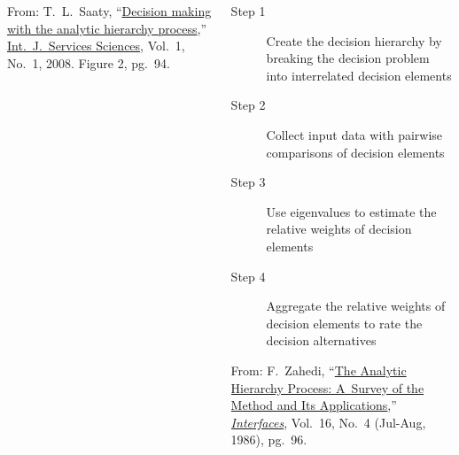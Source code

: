 \documentclass[10pt,handout,hyperref={colorlinks=true,linkcolor=blue,citecolor=citelink,urlcolor=gray}]{beamer}
\newcounter{e_temp}
\begin{document}
\begin{frame}[label=FlowChart]
{\begin{columns}[c]
\begin{column}{0.45\textwidth}
	\parbox{\textwidth}{From: T.~L.~Saaty, ``\href{http://mathsci2.appstate.edu/~wmcb/Class/5340/ClassNotes141/AHP/Analytic\%20Hierarchy\%20Proc\%20Saaty\%202008.pdf}{Decision making with the analytic hierarchy process},'' \href{http://www.inderscience.com/info/inarticletoc.php?jcode=ijssci&year=2013&vol=5&issue=1}{Int.~J.~Services Sciences}, Vol.~1, No.~1, 2008. Figure 2, pg.~94.}
	\vfill
      \end{column}
      \pause
      \begin{column}{0.55\textwidth}
      	\hspace*{-10ex}\parbox{1.125\textwidth}{%
	\begin{description}
	\item[Step 1]  Create the decision hierarchy by breaking the decision problem into interrelated decision elements
	\item[Step 2]  Collect input data with pairwise comparisons of decision elements
	\item[Step 3]  Use eigenvalues to estimate the relative weights of decision elements
	\item[Step 4]  Aggregate the relative weights of decision elements to rate the decision alternatives \\[9.5ex]
	\end{description}}
	\vfill
	From: F.~Zahedi, ``\href{http://www.jstor.org/stable/25060854}{The Analytic Hierarchy Process: A~Survey of the Method and Its Applications},'' 
	\href{http://pubsonline.informs.org/toc/inte/current}{\emph{Interfaces}}, Vol.~16, No.~4 (Jul-Aug, 1986), pg.~96.
      \end{column}
\end{columns}
\vfill
\centerline{\href{run:AHP Spreadsheet.xlsx}{}}
}
\end{frame}
\end{document}
